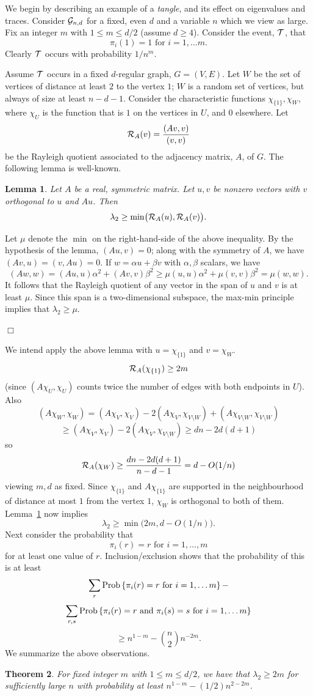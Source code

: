 \documentclass[12pt]{article}
\newtheorem{theorem}{Theorem}[section]
\newtheorem{lemma}[theorem]{Lemma}
\newcommand{\ct}{{\cal T}}
\newcommand{\cg}{{\cal G}}
\newcommand{\cgnd}{\cg_{n,d}}
\newcommand{\tangle}{\ct}
\newcommand{\tanglefirst}{\tangle}
\newcommand{\prob}[1]{{\rm Prob}\left\{ #1 \right\} }
\newcommand{\proof}{{\par\noindent {\bf Proof}\space\space}}
\newcommand{\proofbox}{\begin{flushright}$\Box$\end{flushright}}
\begin{document}
We begin by describing an example of a {\em tangle}, and its effect
on eigenvalues and traces.
Consider $\cgnd$ for a fixed, even $d$ and a variable $n$ which we
view as large.  
Fix an integer $m$ with $1\le m\le d/2$ (assume $d\ge 4$).
Consider the event, $\tanglefirst$, that
$$
\mbox{$\pi_i(1)=1$ for $i=1,\ldots m$.}
$$
Clearly $\tanglefirst$ occurs with probability $1/n^m$.

Assume $\tanglefirst$ occurs in a fixed $d$-regular graph, $G=(V,E)$.
Let $W$ be the set of vertices of distance at least $2$ to the vertex $1$;
$W$ is a random set of vertices, but always of size at least $n-d-1$.
Consider the characteristic functions $\chi_{\{1\}},\chi_{W}$,
where $\chi_U$ is the function that is $1$ on the vertices in $U$, and 
$0$ elsewhere.  Let
$$
{\cal R}_A(v) = \frac{(Av,v)}{(v,v)}
$$
be the Rayleigh quotient associated to the adjacency matrix, $A$, of $G$.
The following lemma is well-known.
\begin{lemma}\label{lm:fix_bug}
Let $A$ be a real, symmetric matrix.
Let $u,v$ be nonzero vectors with $v$ orthogonal to $u$ and $Au$.  Then
$$
\lambda_2 \ge \min\bigl( {\cal R}_A(u), {\cal R}_A(v) \bigr).
$$
\end{lemma}
\proof Let $\mu$ denote the $\min$ on the right-hand-side of the above
inequality.  
By the hypothesis of the lemma, $(Au,v)=0$; along with the symmetry of $A$,
we have $(Av,u)=(v,Au)=0$.
If $w=\alpha u+\beta v$ with $\alpha,\beta$ scalars,
we have
$$
(Aw,w)= (Au,u)\alpha^2+(Av,v)\beta^2 \ge
\mu(u,u)\alpha^2+\mu(v,v)\beta^2 = \mu(w,w).
$$
It follows that the Rayleigh quotient of any vector in the span of $u$ and
$v$ is at least $\mu$.  Since this span is a two-dimensional subspace, the
max-min principle implies that $\lambda_2\ge \mu$.
\proofbox

We intend apply the above lemma with $u=\chi_{\{1\}}$ and $v=\chi_W$.
$$
{\cal R}_A(\chi_{\{1\}}) \ge 2m
$$
(since $(A\chi_U,\chi_U)$ counts twice the number of edges with both endpoints
in $U$).  Also
$$
(A\chi_{W},\chi_{W})
= (A\chi_V,\chi_V)-2(A\chi_V,\chi_{V\setminus W})+(A\chi_{V\setminus W},
\chi_{V\setminus W})
$$
$$
\ge (A\chi_V,\chi_V)-2(A\chi_V,\chi_{V\setminus W}) \ge dn-2d(d+1)
$$
so
$$
{\cal R}_A(\chi_{W}) \ge \frac{dn -2d(d+1)}{n-d-1}=d-O(1/n)
$$
viewing $m,d$ as fixed.
Since $\chi_{\{1\}}$ and $A\chi_{\{1\}}$ are supported in the neighbourhood
of distance at most $1$ from the vertex $1$, $\chi_W$ is orthogonal to
both of them.
Lemma~\ref{lm:fix_bug} now implies
$$
\lambda_2 \ge \min\bigl(2m,d-O(1/n)\bigr).
$$
Next consider the probability that 
$$
\mbox{$\pi_i(r)=r$ for $i=1,\ldots, m$}
$$
for at least one value of $r$.  Inclusion/exclusion shows that the
probability of this is at least
$$
\sum_r \prob{\mbox{$\pi_i(r)=r$ for $i=1,\ldots m$}} -
$$
$$
\sum_{r,s} \prob{\mbox{$\pi_i(r)=r$ and $\pi_i(s)=s$ for $i=1,\ldots m$}}
$$
$$
\ge n^{1-m}-\binom{n}{2} n^{-2m}.
$$
We summarize the above observations.
\begin{theorem}\label{th:weak}
For fixed integer $m$ with $1\le m\le d/2$,
we have that $\lambda_2\ge 2m$
for sufficiently large $n$ with probability at least
$n^{1-m}-(1/2)n^{2-2m}$.
\end{theorem}
\end{document}

